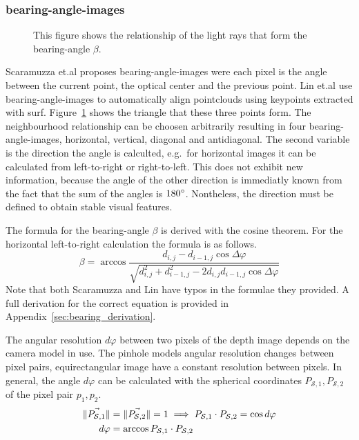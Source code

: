 \subsubsection{\Glspl{bearing-angle-image}}

\begin{figure}[H]
    \centering
    \caption[Schematic Representation of Bearing-Angles]{This figure shows the relationship of the light rays that form the \gls{bearing-angle} $\beta$.}\label{fig:bearing_angle}
\end{figure}

Scaramuzza et.al\cite{Scaramuzza2007} proposes \Glspl{bearing-angle-image} were each pixel is the angle between the current point, the optical center and the previous point.
Lin et.al\cite{Lin2017} use \Glspl{bearing-angle-image} to automatically align pointclouds using keypoints extracted with \acrshort{surf}.
Figure~\ref{fig:bearing_angle} shows the triangle that these three points form.
The neighbourhood relationship can be choosen arbitrarily resulting in four \Glspl{bearing-angle-image}, horizontal, vertical, diagonal and antidiagonal.
The second variable is the direction the angle is calculted, e.g.~for horizontal images it can be calculated from left-to-right or right-to-left.
This does not exhibit new information, because the angle of the other direction is immediatly known from the fact that the sum of the angles is $180\degree$.
Nontheless, the direction must be defined to obtain stable visual features.

The formula for the \gls{bearing-angle} $\beta$ is derived with the cosine theorem.
For the horizontal left-to-right calculation the formula is as follows.
\begin{equation}\label{eq:bearing-angle}
    \beta = \arccos%
            \frac{d_{i,j} - d_{i-1,j} \cos \Delta\varphi}%
                 {\sqrt{d_{i,j}^2 + d_{i-1,j}^2 - 2 d_{i,j} d_{i-1,j} \cos \Delta\varphi}}
\end{equation}
Note that both Scaramuzza\cite{Scaramuzza2007} and Lin\cite{Lin2017} have typos in the formulae they provided.
A full derivation for the correct equation is provided in Appendix~\ref{sec:bearing_derivation}.

The angular resolution $d\varphi$ between two pixels of the depth image depends on the camera model in use.
The pinhole models angular resolution changes between pixel pairs, equirectangular image have a constant resolution between pixels.
In general, the angle $d\varphi$ can be calculated with the spherical coordinates $P_{\mathcal{S},1}, P_{\mathcal{S},2}$ of the pixel pair $p_1, p_2$.
\begin{equation}
\begin{aligned}
    \lVert\vec{P_{\mathcal{S},1}}\rVert &= \lVert\vec{P_{\mathcal{S},2}}\rVert = 1 \implies P_{\mathcal{S},1} \cdot P_{\mathcal{S},2} = \cos d\varphi \\
    d\varphi &= \arccos P_{\mathcal{S},1} \cdot P_{\mathcal{S},2}
\end{aligned}
\end{equation}

